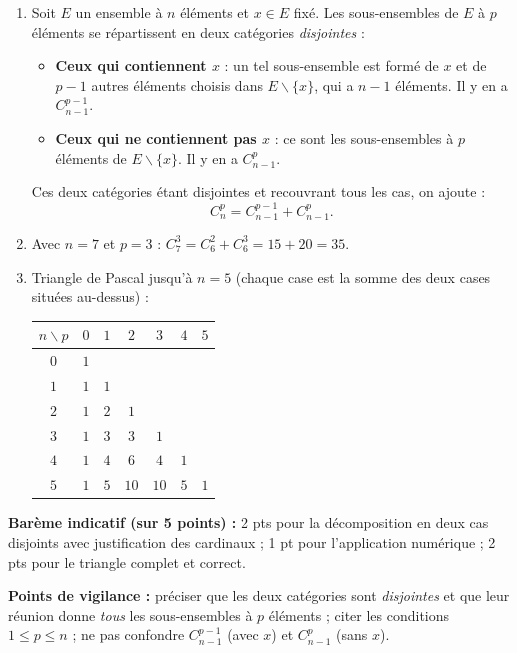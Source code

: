 \documentclass[11pt]{article}
\def\setminus{\mathbin{\backslash}}\let\smallsetminus\setminus
\begin{document}
\begin{corrige}
\begin{enumerate}
    \item Soit $E$ un ensemble à $n$ éléments et $x \in E$ fixé. Les sous-ensembles de $E$ à $p$ éléments se répartissent en deux catégories \emph{disjointes} :
    \begin{itemize}
        \item \textbf{Ceux qui contiennent $x$} : un tel sous-ensemble est formé de $x$ et de $p-1$ autres éléments choisis dans $E \setminus \{x\}$, qui a $n-1$ éléments. Il y en a $C_{n-1}^{p-1}$.
        \item \textbf{Ceux qui ne contiennent pas $x$} : ce sont les sous-ensembles à $p$ éléments de $E \setminus \{x\}$. Il y en a $C_{n-1}^{p}$.
    \end{itemize}
    Ces deux catégories étant disjointes et recouvrant tous les cas, on ajoute :
    \[ C_n^p = C_{n-1}^{p-1} + C_{n-1}^{p}. \]
    \item Avec $n = 7$ et $p = 3$ : $C_7^3 = C_6^2 + C_6^3 = 15 + 20 = 35$.
    \item Triangle de Pascal jusqu'à $n = 5$ (chaque case est la somme des deux cases situées au-dessus) :
    \begin{center}
    \begin{tabular}{|c|cccccc|}\hline
    $n \backslash p$ & $0$ & $1$ & $2$ & $3$ & $4$ & $5$ \\ \hline
    $0$ & $1$ & & & & & \\ \hline
    $1$ & $1$ & $1$ & & & & \\ \hline
    $2$ & $1$ & $2$ & $1$ & & & \\ \hline
    $3$ & $1$ & $3$ & $3$ & $1$ & & \\ \hline
    $4$ & $1$ & $4$ & $6$ & $4$ & $1$ & \\ \hline
    $5$ & $1$ & $5$ & $10$ & $10$ & $5$ & $1$ \\ \hline
    \end{tabular}
    \end{center}
\end{enumerate}

\textbf{Barème indicatif (sur 5 points) :} 2 pts pour la décomposition en deux cas disjoints avec justification des cardinaux ; 1 pt pour l'application numérique ; 2 pts pour le triangle complet et correct.

\textbf{Points de vigilance :} préciser que les deux catégories sont \emph{disjointes} et que leur réunion donne \emph{tous} les sous-ensembles à $p$ éléments ; citer les conditions $1 \le p \le n$ ; ne pas confondre $C_{n-1}^{p-1}$ (avec $x$) et $C_{n-1}^{p}$ (sans $x$).
\end{corrige}
\end{document}

